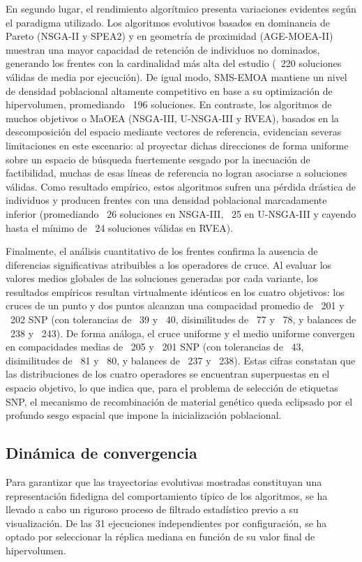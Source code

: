 En segundo lugar, el rendimiento algorítmico presenta variaciones evidentes según el paradigma utilizado. Los algoritmos evolutivos basados en dominancia de Pareto (NSGA-II y SPEA2) y en geometría de proximidad (AGE-MOEA-II) muestran una mayor capacidad de retención de individuos no dominados, generando los frentes con la cardinalidad más alta del estudio (~220 soluciones válidas de media por ejecución). De igual modo, SMS-EMOA mantiene un nivel de densidad poblacional altamente competitivo en base a su optimización de hipervolumen, promediando ~196 soluciones. En contraste, los algoritmos de muchos objetivos o MaOEA (NSGA-III, U-NSGA-III y RVEA), basados en la descomposición del espacio mediante vectores de referencia, evidencian severas limitaciones en este escenario: al proyectar dichas direcciones de forma uniforme sobre un espacio de búsqueda fuertemente sesgado por la inecuación de factibilidad, muchas de esas líneas de referencia no logran asociarse a soluciones válidas. Como resultado empírico, estos algoritmos sufren una pérdida drástica de individuos y producen frentes con una densidad poblacional marcadamente inferior (promediando ~26 soluciones en NSGA-III, ~25 en U-NSGA-III y cayendo hasta el mínimo de ~24 soluciones válidas en RVEA).

Finalmente, el análisis cuantitativo de los frentes confirma la ausencia de diferencias significativas atribuibles a los operadores de cruce. Al evaluar los valores medios globales de las soluciones generadas por cada variante, los resultados empíricos resultan virtualmente idénticos en los cuatro objetivos: los cruces de un punto y dos puntos alcanzan una compacidad promedio de ~201 y ~202 SNP (con tolerancias de ~39 y ~40, disimilitudes de ~77 y ~78, y balances de ~238 y ~243). De forma análoga, el cruce uniforme y el medio uniforme convergen en compacidades medias de ~205 y ~201 SNP (con tolerancias de ~43, disimilitudes de ~81 y ~80, y balances de ~237 y ~238). Estas cifras constatan que las distribuciones de los cuatro operadores se encuentran superpuestas en el espacio objetivo, lo que indica que, para el problema de selección de etiquetas SNP, el mecanismo de recombinación de material genético queda eclipsado por el profundo sesgo espacial que impone la inicialización poblacional.

\subsection{Dinámica de convergencia}

Para garantizar que las trayectorias evolutivas mostradas constituyan una representación fidedigna del comportamiento típico de los algoritmos, se ha llevado a cabo un riguroso proceso de filtrado estadístico previo a su visualización. De las 31 ejecuciones independientes por configuración, se ha optado por seleccionar la réplica mediana en función de su valor final de hipervolumen.

